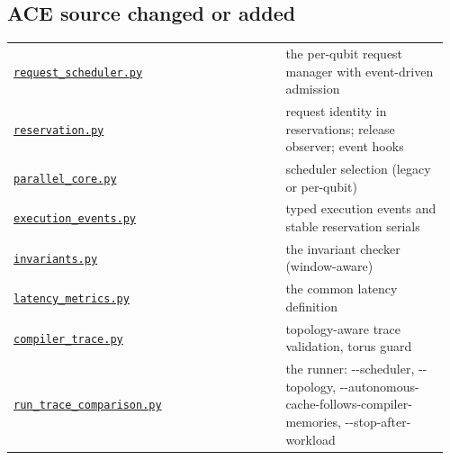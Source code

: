 {\subsection*{ACE source changed or added}
\begin{longtable}{@{}p{0.60\linewidth}p{0.36\linewidth}@{}}
\href{https://github.com/sanjeevkrishnaa/Compiler-Driven-ACE/blob/codex/ace-scheduler-correctness/request_scheduler.py}{\nolinkurl{request_scheduler.py}} & the per-qubit request manager with event-driven admission \\
\href{https://github.com/sanjeevkrishnaa/Compiler-Driven-ACE/blob/codex/ace-scheduler-correctness/reservation.py}{\nolinkurl{reservation.py}} & request identity in reservations; release observer; event hooks \\
\href{https://github.com/sanjeevkrishnaa/Compiler-Driven-ACE/blob/codex/ace-scheduler-correctness/parallel_core.py}{\nolinkurl{parallel_core.py}} & scheduler selection (legacy or per-qubit) \\
\href{https://github.com/sanjeevkrishnaa/Compiler-Driven-ACE/blob/codex/ace-scheduler-correctness/execution_events.py}{\nolinkurl{execution_events.py}} & typed execution events and stable reservation serials \\
\href{https://github.com/sanjeevkrishnaa/Compiler-Driven-ACE/blob/codex/ace-scheduler-correctness/invariants.py}{\nolinkurl{invariants.py}} & the invariant checker (window-aware) \\
\href{https://github.com/sanjeevkrishnaa/Compiler-Driven-ACE/blob/codex/ace-scheduler-correctness/latency_metrics.py}{\nolinkurl{latency_metrics.py}} & the common latency definition \\
\href{https://github.com/sanjeevkrishnaa/Compiler-Driven-ACE/blob/codex/ace-scheduler-correctness/compiler_trace.py}{\nolinkurl{compiler_trace.py}} & topology-aware trace validation, torus guard \\
\href{https://github.com/sanjeevkrishnaa/Compiler-Driven-ACE/blob/codex/ace-scheduler-correctness/run_trace_comparison.py}{\nolinkurl{run_trace_comparison.py}} & the runner: -{}-scheduler, -{}-topology, -{}-autonomous-cache-follows-compiler-memories, -{}-stop-after-workload \\
\end{longtable}
}
